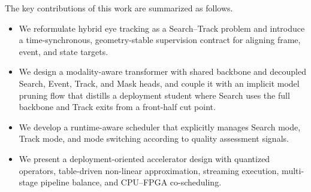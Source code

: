 \documentclass[journal]{IEEEtran}
\begin{document}
The key contributions of this work are summarized as follows.
\begin{itemize}
    \item We reformulate hybrid eye tracking as a Search--Track problem and introduce a time-synchronous, geometry-stable supervision contract for aligning frame, event, and state targets.
    \item We design a modality-aware transformer with shared backbone and decoupled Search, Event, Track, and Mask heads, and couple it with an implicit model pruning flow that distills a deployment student where Search uses the full backbone and Track exits from a front-half cut point.
    \item We develop a runtime-aware scheduler that explicitly manages Search mode, Track mode, and mode switching according to quality assessment signals.
    \item We present a deployment-oriented accelerator design with quantized operators, table-driven non-linear approximation, streaming execution, multi-stage pipeline balance, and CPU--FPGA co-scheduling.
\end{itemize}
\end{document}
